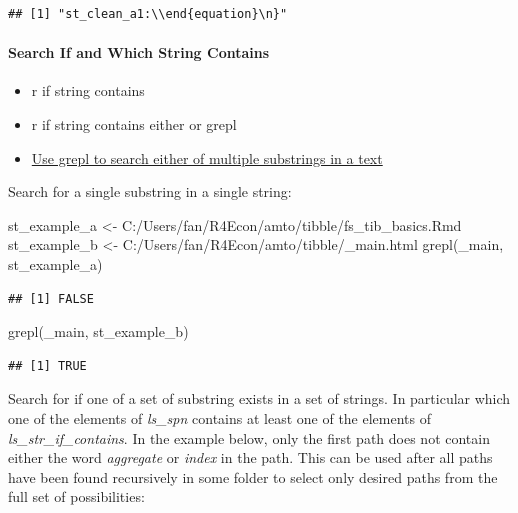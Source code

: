 \documentclass[
]{book}
\newenvironment{Shaded}{\begin{snugshade}}{\end{snugshade}}
\newcommand{\FunctionTok}[1]{\textcolor[rgb]{0.00,0.00,0.00}{#1}}
\newcommand{\NormalTok}[1]{#1}
\newcommand{\OtherTok}[1]{\textcolor[rgb]{0.56,0.35,0.01}{#1}}
\newcommand{\StringTok}[1]{\textcolor[rgb]{0.31,0.60,0.02}{#1}}
\providecommand{\tightlist}{%
  \setlength{\itemsep}{0pt}\setlength{\parskip}{0pt}}
\begin{document}
\begin{verbatim}
## [1] "st_clean_a1:\\end{equation}\n}"
\end{verbatim}

\hypertarget{search-if-and-which-string-contains}{%
\paragraph{Search If and Which String Contains}\label{search-if-and-which-string-contains}}

\begin{itemize}
\tightlist
\item
  r if string contains
\item
  r if string contains either or grepl
\item
  \href{https://stackoverflow.com/a/26319765/8280804}{Use grepl to search either of multiple substrings in a text}
\end{itemize}

Search for a single substring in a single string:

\begin{Shaded}
\begin{Highlighting}[]
\NormalTok{st\_example\_a }\OtherTok{\textless{}{-}} \StringTok{\textquotesingle{}C:/Users/fan/R4Econ/amto/tibble/fs\_tib\_basics.Rmd\textquotesingle{}}
\NormalTok{st\_example\_b }\OtherTok{\textless{}{-}} \StringTok{\textquotesingle{}C:/Users/fan/R4Econ/amto/tibble/\_main.html\textquotesingle{}}
\FunctionTok{grepl}\NormalTok{(}\StringTok{\textquotesingle{}\_main\textquotesingle{}}\NormalTok{, st\_example\_a)}
\end{Highlighting}
\end{Shaded}

\begin{verbatim}
## [1] FALSE
\end{verbatim}

\begin{Shaded}
\begin{Highlighting}[]
\FunctionTok{grepl}\NormalTok{(}\StringTok{\textquotesingle{}\_main\textquotesingle{}}\NormalTok{, st\_example\_b)}
\end{Highlighting}
\end{Shaded}

\begin{verbatim}
## [1] TRUE
\end{verbatim}

Search for if one of a set of substring exists in a set of strings. In particular which one of the elements of \emph{ls\_spn} contains at least one of the elements of \emph{ls\_str\_if\_contains}. In the example below, only the first path does not contain either the word \emph{aggregate} or \emph{index} in the path. This can be used after all paths have been found recursively in some folder to select only desired paths from the full set of possibilities:
\end{document}
